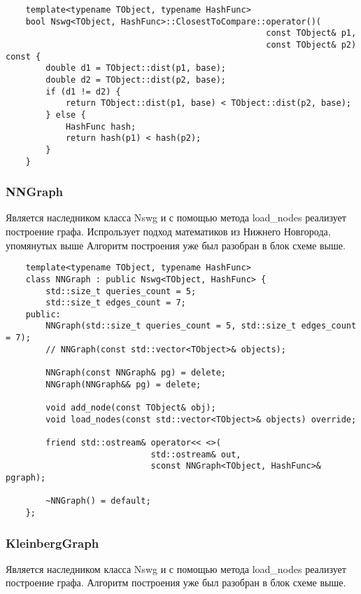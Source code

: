 \begin{verbatim}
    template<typename TObject, typename HashFunc>
    bool Nswg<TObject, HashFunc>::ClosestToCompare::operator()(
                                                    const TObject& p1, 
                                                    const TObject& p2) const {
        double d1 = TObject::dist(p1, base);
        double d2 = TObject::dist(p2, base);
        if (d1 != d2) {
            return TObject::dist(p1, base) < TObject::dist(p2, base);
        } else {
            HashFunc hash;
            return hash(p1) < hash(p2);
        }
    }
\end{verbatim}

\subsubsection{NNGraph}

Является наследником класса Nswg и с помощью метода load\_nodes реализует постро\-ение графа.
Испрользует подход математиков из Нижнего Новгорода, упомянутых выше
Алго\-ритм построения уже был разобран в блок схеме выше.

\begin{verbatim}
    template<typename TObject, typename HashFunc>
    class NNGraph : public Nswg<TObject, HashFunc> {
        std::size_t queries_count = 5;
        std::size_t edges_count = 7;
    public:
        NNGraph(std::size_t queries_count = 5, std::size_t edges_count = 7);
        // NNGraph(const std::vector<TObject>& objects);

        NNGraph(const NNGraph& pg) = delete;
        NNGraph(NNGraph&& pg) = delete;

        void add_node(const TObject& obj);
        void load_nodes(const std::vector<TObject>& objects) override;

        friend std::ostream& operator<< <>(
                             std::ostream& out, 
                             sconst NNGraph<TObject, HashFunc>& pgraph);

        ~NNGraph() = default;
    };
\end{verbatim}


\subsubsection{KleinbergGraph}

Является наследником класса Nswg и с помощью метода load\_nodes реализует постро\-ение графа.
Алгоритм построения уже был разобран в блок схеме выше.

